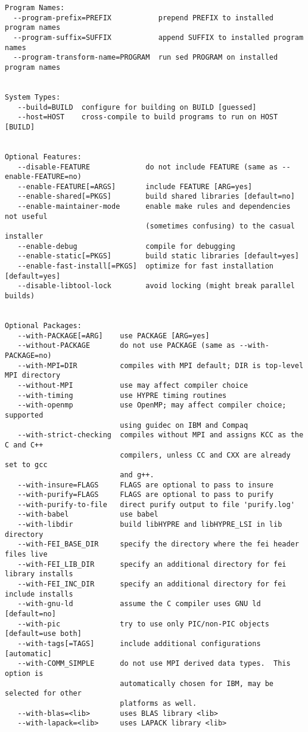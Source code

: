\begin{verbatim}
Program Names:
  --program-prefix=PREFIX           prepend PREFIX to installed program names
  --program-suffix=SUFFIX           append SUFFIX to installed program names
  --program-transform-name=PROGRAM  run sed PROGRAM on installed program names


System Types:
   --build=BUILD  configure for building on BUILD [guessed]
   --host=HOST    cross-compile to build programs to run on HOST [BUILD]


Optional Features:
   --disable-FEATURE             do not include FEATURE (same as --enable-FEATURE=no)
   --enable-FEATURE[=ARGS]       include FEATURE [ARG=yes]
   --enable-shared[=PKGS]        build shared libraries [default=no]
   --enable-maintainer-mode      enable make rules and dependencies not useful
                                 (sometimes confusing) to the casual installer
   --enable-debug                compile for debugging
   --enable-static[=PKGS]        build static libraries [default=yes]
   --enable-fast-install[=PKGS]  optimize for fast installation [default=yes]
   --disable-libtool-lock        avoid locking (might break parallel builds)


Optional Packages:
   --with-PACKAGE[=ARG]    use PACKAGE [ARG=yes]
   --without-PACKAGE       do not use PACKAGE (same as --with-PACKAGE=no)
   --with-MPI=DIR          compiles with MPI default; DIR is top-level MPI directory
   --without-MPI           use may affect compiler choice
   --with-timing           use HYPRE timing routines
   --with-openmp           use OpenMP; may affect compiler choice; supported 
                           using guidec on IBM and Compaq
   --with-strict-checking  compiles without MPI and assigns KCC as the C and C++
                           compilers, unless CC and CXX are already set to gcc 
                           and g++.
   --with-insure=FLAGS     FLAGS are optional to pass to insure
   --with-purify=FLAGS     FLAGS are optional to pass to purify
   --with-purify-to-file   direct purify output to file 'purify.log'
   --with-babel            use babel
   --with-libdir           build libHYPRE and libHYPRE_LSI in lib directory
   --with-FEI_BASE_DIR     specify the directory where the fei header files live
   --with-FEI_LIB_DIR      specify an additional directory for fei library installs
   --with-FEI_INC_DIR      specify an additional directory for fei include installs
   --with-gnu-ld           assume the C compiler uses GNU ld [default=no]
   --with-pic              try to use only PIC/non-PIC objects [default=use both]
   --with-tags[=TAGS]      include additional configurations [automatic]
   --with-COMM_SIMPLE      do not use MPI derived data types.  This option is 
                           automatically chosen for IBM, may be selected for other
                           platforms as well.
   --with-blas=<lib>       uses BLAS library <lib>
   --with-lapack=<lib>     uses LAPACK library <lib>



\end{verbatim}
